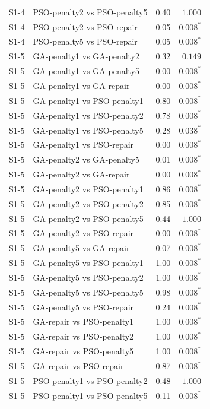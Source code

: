 \begin{tabular}{llrr}
S1-4 & PSO-penalty2 vs PSO-penalty5 & 0.40 & $1.000$ \\
S1-4 & PSO-penalty2 vs PSO-repair & 0.05 & $0.008^{*}$ \\
S1-4 & PSO-penalty5 vs PSO-repair & 0.05 & $0.008^{*}$ \\
S1-5 & GA-penalty1 vs GA-penalty2 & 0.32 & $0.149$ \\
S1-5 & GA-penalty1 vs GA-penalty5 & 0.00 & $0.008^{*}$ \\
S1-5 & GA-penalty1 vs GA-repair & 0.00 & $0.008^{*}$ \\
S1-5 & GA-penalty1 vs PSO-penalty1 & 0.80 & $0.008^{*}$ \\
S1-5 & GA-penalty1 vs PSO-penalty2 & 0.78 & $0.008^{*}$ \\
S1-5 & GA-penalty1 vs PSO-penalty5 & 0.28 & $0.038^{*}$ \\
S1-5 & GA-penalty1 vs PSO-repair & 0.00 & $0.008^{*}$ \\
S1-5 & GA-penalty2 vs GA-penalty5 & 0.01 & $0.008^{*}$ \\
S1-5 & GA-penalty2 vs GA-repair & 0.00 & $0.008^{*}$ \\
S1-5 & GA-penalty2 vs PSO-penalty1 & 0.86 & $0.008^{*}$ \\
S1-5 & GA-penalty2 vs PSO-penalty2 & 0.85 & $0.008^{*}$ \\
S1-5 & GA-penalty2 vs PSO-penalty5 & 0.44 & $1.000$ \\
S1-5 & GA-penalty2 vs PSO-repair & 0.00 & $0.008^{*}$ \\
S1-5 & GA-penalty5 vs GA-repair & 0.07 & $0.008^{*}$ \\
S1-5 & GA-penalty5 vs PSO-penalty1 & 1.00 & $0.008^{*}$ \\
S1-5 & GA-penalty5 vs PSO-penalty2 & 1.00 & $0.008^{*}$ \\
S1-5 & GA-penalty5 vs PSO-penalty5 & 0.98 & $0.008^{*}$ \\
S1-5 & GA-penalty5 vs PSO-repair & 0.24 & $0.008^{*}$ \\
S1-5 & GA-repair vs PSO-penalty1 & 1.00 & $0.008^{*}$ \\
S1-5 & GA-repair vs PSO-penalty2 & 1.00 & $0.008^{*}$ \\
S1-5 & GA-repair vs PSO-penalty5 & 1.00 & $0.008^{*}$ \\
S1-5 & GA-repair vs PSO-repair & 0.87 & $0.008^{*}$ \\
S1-5 & PSO-penalty1 vs PSO-penalty2 & 0.48 & $1.000$ \\
S1-5 & PSO-penalty1 vs PSO-penalty5 & 0.11 & $0.008^{*}$ \\

\end{tabular}
